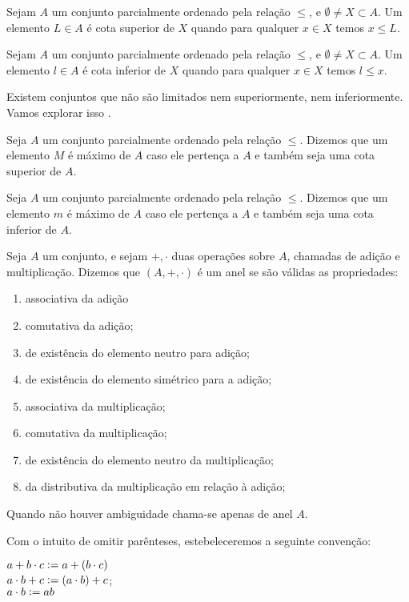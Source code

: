 \documentclass[../main.tex]{subfiles}
\begin{document}
\begin{defi}\label{agb-def-limiteSup}
    Sejam $A$ um conjunto parcialmente ordenado pela relação $\leq$, e $\emptyset \neq X \subset A$. Um elemento $L \in A$ é cota superior de $X$ quando para qualquer $x \in  X$ temos $x \leq L$.
\end{defi}
\begin{defi}
    Sejam $A$ um conjunto parcialmente ordenado pela relação $\leq$, e $\emptyset \neq X \subset A$. Um elemento $l \in A$ é cota inferior de $X$ quando para qualquer $x \in  X$ temos $l \leq x$.
\end{defi}

Existem conjuntos que não são limitados nem superiormente, nem inferiormente. Vamos explorar isso .

\begin{defi}\label{agb-def-maximo}
    Seja $A$ um conjunto parcialmente ordenado pela relação $\leq$. Dizemos que um elemento $M$ é máximo de $A$ caso ele pertença a $A$ e também seja uma cota superior de $A$.
\end{defi}

\begin{defi}\label{agb-def-minimo}
    Seja $A$ um conjunto parcialmente ordenado pela relação $\leq$. Dizemos que um elemento $m$ é máximo de $A$ caso ele pertença a $A$ e também seja uma cota inferior de $A$.
\end{defi}



\begin{defi}\label{agb-def-anel}
    Seja $A$ um conjunto, e sejam $+, \cdot$ duas operações sobre $A$, chamadas de adição e multiplicação. Dizemos que $(A, +, \cdot)$ é um anel se são válidas as propriedades:
    \begin{enumerate}[label=(\roman*)]
        \item associativa da adição
        \item comutativa da adição;
        \item de existência do elemento neutro para adição;
        \item de existência do elemento simétrico para a adição;
        \item associativa da multiplicação;
        \item comutativa da multiplicação;
        \item de existência do elemento neutro da multiplicação;
        \item da distributiva da multiplicação em relação à adição;
    \end{enumerate}
    Quando não houver ambiguidade chama-se apenas de anel $A$.
\end{defi}
\begin{obs}
	Com o intuito de omitir parênteses, estebeleceremos a seguinte convenção: 
	\begin{center}
    	$a + b \cdot c \vcentcolon= a + (b \cdot c)$  \\
    	$a \cdot b + c \vcentcolon= (a \cdot b) + c$; \\
    	$a \cdot b \vcentcolon= ab$	    
	\end{center}
\end{obs}
\end{document}

